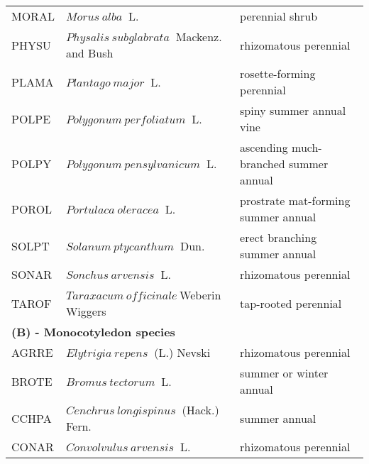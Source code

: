 \documentclass[
]{article}
\begin{document}
\begin{table}[H]
\begin{tabular}[t]{l|l|l}
\hspace{1em}MORAL & $Morus~alba$$~$ L. & perennial shrub\\
 
\hspace{1em}PHYSU & $Physalis~subglabrata$$~$ Mackenz. and Bush & rhizomatous perennial\\
 
\hspace{1em}PLAMA & $Plantago~major$$~$ L. & rosette-forming perennial\\
 
\hspace{1em}POLPE & $Polygonum~perfoliatum$$~$ L. & spiny summer annual vine\\
 
\hspace{1em}POLPY & $Polygonum~pensylvanicum$$~$ L. & ascending much-branched summer annual\\
 
\hspace{1em}POROL & $Portulaca~oleracea$$~$ L. & prostrate mat-forming summer annual\\
 
\hspace{1em}SOLPT & $Solanum~ptycanthum$$~$ Dun. & erect branching summer annual\\
 
\hspace{1em}SONAR & $Sonchus~arvensis$$~$ L. & rhizomatous perennial\\
 
\hspace{1em}TAROF & $Taraxacum~officinale$$~$Weberin$~$Wiggers & tap-rooted perennial\\
 
\multicolumn{3}{l}{\textbf{(B) - Monocotyledon species}}\\
\hline
\hspace{1em}AGRRE & $Elytrigia~repens$$~$ (L.) Nevski & rhizomatous perennial\\
 
\hspace{1em}BROTE & $Bromus~tectorum$$~$ L. & summer or winter annual\\
 
\hspace{1em}CCHPA & $Cenchrus~longispinus$$~$ (Hack.) Fern. & summer annual\\
 
\hspace{1em}CONAR & $Convolvulus~arvensis$$~$ L. & rhizomatous perennial\\
 

\end{tabular}
\end{table}
\end{document}
